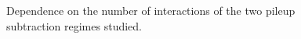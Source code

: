 \begin{figure}
\hfill
{}
\hfill
{}
\hfill
\caption{Dependence on the number of interactions of the two pileup subtraction regimes studied.}
\label{simp}
\end{figure}

